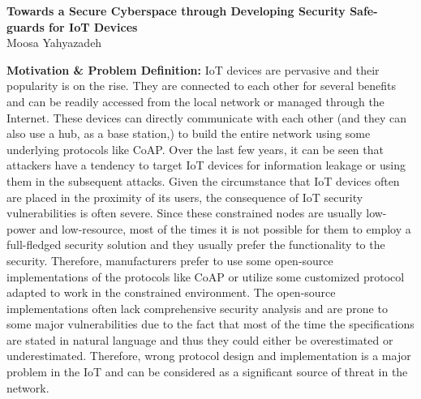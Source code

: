 \documentclass[10pt,onecolumn]{article}
\date{}
\newcommand{\ProposalTitle}{Towards a Secure Cyberspace through Developing Security Safe-guards for IoT Devices}
\begin{document}
\pagestyle{empty}

\sloppypar
\begin{center}
{\large  \bf \ProposalTitle} 
\\
\vspace{3pt} {Moosa Yahyazadeh}\\
\end{center}

\noindent\textbf{Motivation \& Problem Definition:} 
IoT devices are pervasive and their popularity is on the rise. They are connected to each other for several benefits and can be readily accessed from the local network or managed through the Internet. These devices can directly communicate with each other (and they can also use a hub, as a base station,) to build the entire network using some underlying protocols like CoAP. Over the last few years, it can be seen that attackers have a tendency to target IoT devices for information leakage or using them in the subsequent attacks. Given the circumstance that IoT devices often are placed in the proximity of its users, the consequence of IoT security vulnerabilities is often severe. Since these constrained nodes are usually low-power and low-resource, most of the times it is not possible for them to employ a full-fledged security solution and they usually prefer the functionality to the security. Therefore, manufacturers prefer to use some open-source implementations of the protocols like CoAP or utilize some customized protocol adapted to work in the constrained environment. The open-source implementations often lack comprehensive security analysis and are prone to some major vulnerabilities due to the fact that most of the time the specifications are stated in natural language and thus they could either be overestimated or underestimated. Therefore, wrong protocol design and implementation is a major problem in the IoT and can be considered as a significant source of threat in the network.
\end{document}
